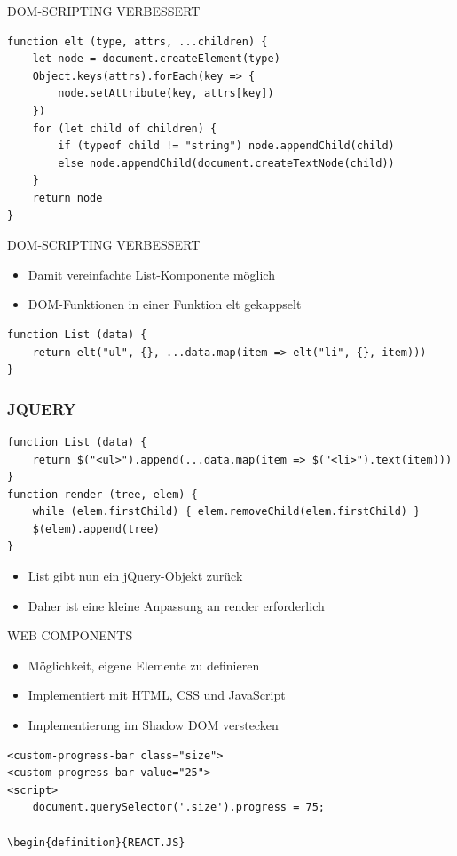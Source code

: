 \begin{definition}{DOM-SCRIPTING VERBESSERT}
\begin{verbatim}
function elt (type, attrs, ...children) {
    let node = document.createElement(type)
    Object.keys(attrs).forEach(key => {
        node.setAttribute(key, attrs[key])
    })
    for (let child of children) {
        if (typeof child != "string") node.appendChild(child)
        else node.appendChild(document.createTextNode(child))
    }
    return node
}
\end{verbatim}
\end{definition}

\begin{definition}{DOM-SCRIPTING VERBESSERT}
\begin{itemize}
  \item Damit vereinfachte List-Komponente möglich
  \item DOM-Funktionen in einer Funktion elt gekappselt
\end{itemize}

\begin{verbatim}
function List (data) {
    return elt("ul", {}, ...data.map(item => elt("li", {}, item)))
}
\end{verbatim}
\end{definition}


\subsubsection{JQUERY}

\begin{verbatim}
function List (data) {
    return $("<ul>").append(...data.map(item => $("<li>").text(item)))
}
function render (tree, elem) {
    while (elem.firstChild) { elem.removeChild(elem.firstChild) }
    $(elem).append(tree)
}
\end{verbatim}

\begin{itemize}
  \item List gibt nun ein jQuery-Objekt zurück
  \item Daher ist eine kleine Anpassung an render erforderlich
\end{itemize}

\begin{definition}{WEB COMPONENTS}
\begin{itemize}
  \item Möglichkeit, eigene Elemente zu definieren
  \item Implementiert mit HTML, CSS und JavaScript
  \item Implementierung im Shadow DOM verstecken
\end{itemize}

\begin{verbatim}
<custom-progress-bar class="size">
<custom-progress-bar value="25">
<script>
    document.querySelector('.size').progress = 75;

\begin{definition}{REACT.JS}
\end{verbatim}
\end{definition}

